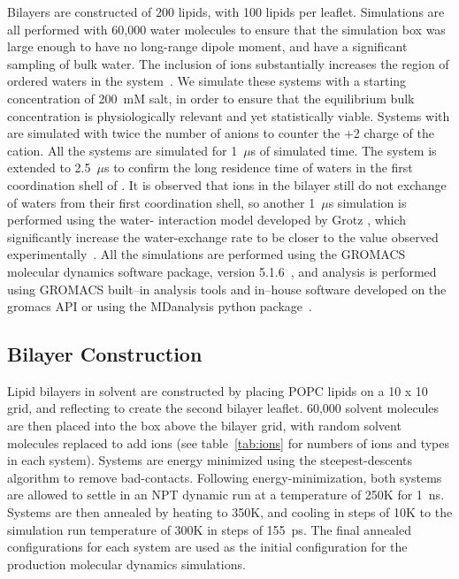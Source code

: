 {Bilayers are constructed of 200 lipids, with 100 lipids per leaflet.}
Simulations are all performed with 
60,000 water molecules to ensure that the simulation box
was large enough to have no long-range dipole moment, 
and have a significant 
sampling of bulk water. The inclusion of ions substantially increases the region of ordered 
waters in the system~\cite{kruczek:2019,saunders:2022}.
We simulate these systems with a starting concentration of 200~mM salt, in order to ensure
that the equilibrium bulk concentration is physiologically relevant and 
{yet} statistically viable.
Systems with \mg are simulated with twice the number of 
anions to counter the +2 charge of the cation. All the systems are simulated for 1~$\mu$s of simulated time. 
The \mgmbnbfix system is extended to 2.5~$\mu$s to confirm the 
long residence time of waters in the first coordination shell of \mg\cite{grotz:2021:optimized}. 
It is observed that ions in the bilayer still do not
exchange of waters from their first coordination shell, 
so another 1~$\mu$s simulation is performed using the water-\mg 
interaction model developed by Grotz \etal, which significantly increase the water-exchange rate to be closer 
to the value observed experimentally~\cite{grotz:2021:optimized}.
{All the} simulations are performed using the GROMACS molecular dynamics software package, 
version 5.1.6~\cite{abraham:2015,pall:2014,van:2005,lindahl:2001,berendsen:1995}, and analysis is performed using 
GROMACS built--in analysis tools and in--house software developed
on the gromacs API or using the MDanalysis python package~\cite{gromacsmanual,mdanalysis1,mdanalysis2}.
\subsection{Bilayer Construction}
Lipid bilayers in solvent are constructed by placing POPC lipids on a 10 x 10 grid,
and reflecting to create the second bilayer leaflet. 60,000 solvent molecules are then placed 
into the box above the bilayer grid, with random solvent molecules replaced to 
add ions (see table~\ref{tab:ions} for numbers of ions and types in each system).
Systems are energy minimized using the steepest-descents algorithm to remove bad-contacts.
Following energy-minimization, both systems are allowed to settle in an NPT dynamic
run at a temperature of 250K for 1~ns. Systems are then annealed by heating to 350K, and
cooling in steps of 10K to the simulation run temperature of 300K in steps of 
155~ps. The final annealed configurations for each system are used as the initial
configuration for the production molecular dynamics simulations.
